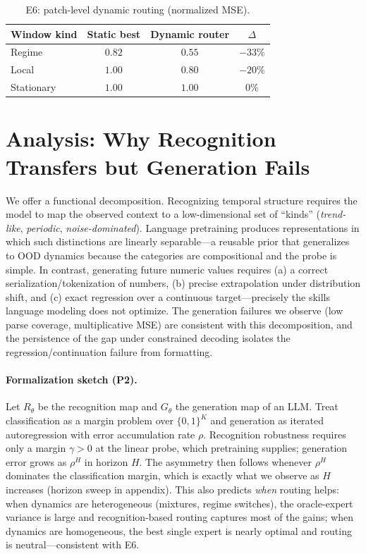 \documentclass{article}
\begin{document}
\begin{table}[t]
\centering
\small
\begin{tabular}{lccc}
\toprule
Window kind & Static best & Dynamic router & $\Delta$ \\
\midrule
Regime & $0.82$ & $0.55$ & $-33\%$ \\
Local & $1.00$ & $0.80$ & $-20\%$ \\
Stationary & $1.00$ & $1.00$ & $0\%$ \\
\bottomrule
\end{tabular}
\caption{E6: patch-level dynamic routing (normalized MSE).}
\label{tab:e6}
\end{table}

\section{Analysis: Why Recognition Transfers but Generation Fails}\label{sec:analysis}

We offer a functional decomposition.  Recognizing temporal structure requires
the model to map the observed context to a low-dimensional set of ``kinds''
(\emph{trend-like}, \emph{periodic}, \emph{noise-dominated}).  Language
pretraining produces representations in which such distinctions are linearly
separable---a reusable prior that generalizes to OOD dynamics because the
categories are compositional and the probe is simple.  In contrast, generating
future numeric values requires (a) a correct serialization/tokenization of
numbers, (b) precise extrapolation under distribution shift, and (c) exact
regression over a continuous target---precisely the skills language modeling
does not optimize.  The generation failures we observe (low parse coverage,
multiplicative MSE) are consistent with this decomposition, and the persistence
of the gap under constrained decoding isolates the regression/continuation
failure from formatting.

\paragraph{Formalization sketch (P2).}  Let $R_\theta$ be the recognition map
and $G_\theta$ the generation map of an LLM.  Treat classification as a
margin problem over $\{0,1\}^K$ and generation as iterated autoregression with
error accumulation rate $\rho$.  Recognition robustness requires only a margin
$\gamma>0$ at the linear probe, which pretraining supplies; generation error
grows as $\rho^H$ in horizon $H$.  The asymmetry then follows whenever
$\rho^H$ dominates the classification margin, which is exactly what we observe
as $H$ increases (horizon sweep in appendix).  This also predicts \emph{when}
routing helps: when dynamics are heterogeneous (mixtures, regime switches), the
oracle-expert variance is large and recognition-based routing captures most of
the gains; when dynamics are homogeneous, the best single expert is nearly
optimal and routing is neutral---consistent with E6.
\end{document}
